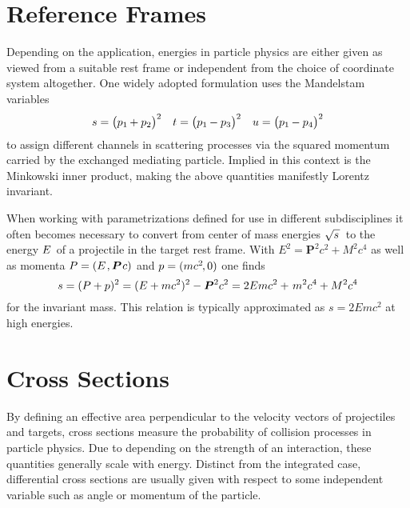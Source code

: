 \label{ch:appendix}



\section{Reference Frames}
\label{sec:frames}

Depending on the application, energies in particle physics are either given as viewed from a suitable rest frame or
independent from the choice of coordinate system altogether. One widely adopted formulation uses the Mandelstam variables
\begin{align*}
	s = \bigl( p_1 \kern-0.5pt + p_2 \bigr)^2 &&
	t = \bigl( p_1 \kern-0.5pt - p_3 \bigr)^2 &&
	u = \bigl( p_1 \kern-0.5pt - p_4 \bigr)^2
\end{align*}
to assign different channels in scattering processes via the squared momentum carried by the exchanged mediating particle.
Implied in this context is the Minkowski inner product, making the above quantities manifestly Lorentz invariant.

When working with parametrizations defined for use in different subdisciplines it often becomes necessary to convert from
center of mass energies $\sqrt{s \kern+1.0pt} \kern+1.0pt$ to the energy $\kern-0.5pt E \kern+1.0pt$ of a projectile in the
target rest frame. With $E^2 = \bm{P}^2 c^2 + M^2 c^4$ as well as momenta $P = (E \kern+1.0pt , \bm{P} \kern+0.75pt c)$ and
$p = (m c^2 \kern-1.0pt , 0)$ one finds
\begin{equation*}
	s = (P + p)^2 = (E + m c^2)^2 - \bm{P}^2 c^2 = 2E m c^2 + \kern+1.0pt m^2 c^4 + M^2 c^4
\end{equation*}
for the invariant mass. This relation is typically approximated as $s = 2E m c^2$ at high energies.



\section{Cross Sections}
\label{sec:cross}

By defining an effective area perpendicular to the velocity vectors of projectiles and targets, cross sections measure
the probability of collision processes in particle physics. Due to depending on the strength of an interaction, these
quantities generally scale with energy. Distinct from the integrated case, differential cross sections are usually given
with respect to some independent variable such as angle or momentum of the particle.




